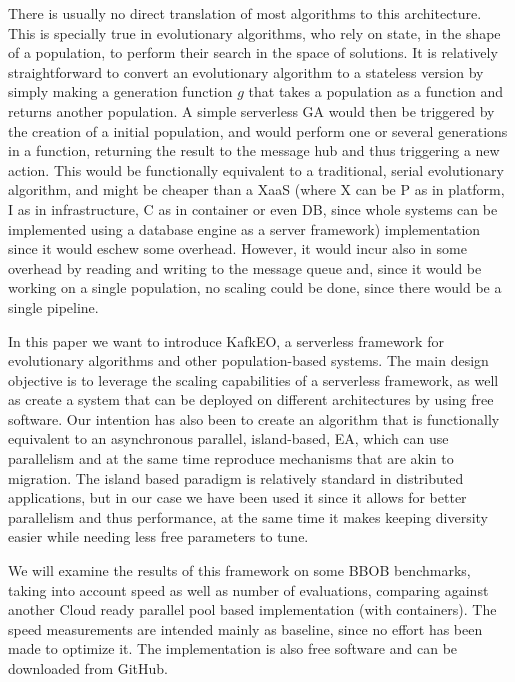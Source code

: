 \documentclass[sigconf]{acmart}
\begin{document}
There is usually no direct translation of most algorithms to this
architecture. This is specially true in evolutionary algorithms, who
rely on state, in the shape of a population, to perform their search
in the space of solutions. It is relatively straightforward to convert
an evolutionary algorithm to a stateless version by simply making a
{\sf generation} function $g$ that takes a population as a function
and returns another population. A simple serverless GA would then be
triggered by the creation of a initial population, and would perform
one or several generations in a function, returning the result to the
message hub and thus triggering a new action. This would be
functionally equivalent to a traditional, serial evolutionary
algorithm, and might be cheaper than a XaaS (where X can be P as in
platform, I as in infrastructure, C as in container or even DB, since
whole systems can be implemented using a database engine as a server framework) implementation since it
would eschew some overhead. However, it would incur also in some
overhead by reading and writing to the message queue and, since it
would be working on a single population, no scaling could be done,
since there would be a single pipeline.

In this paper we want to introduce KafkEO, a serverless framework for
evolutionary algorithms and other population-based systems. The main
design objective is to leverage the scaling capabilities of a
serverless framework, as well as create a system that can be deployed
on different architectures by using free software. Our intention has
also been to create an algorithm that is functionally equivalent to an asynchronous
parallel, island-based, EA, which can use parallelism and at the same
time reproduce mechanisms that are akin to migration. The island based
paradigm is relatively standard in distributed applications, but in
our case we have been used it since it allows for better parallelism
and thus performance, at the same time it makes keeping diversity
easier while needing less free parameters to tune. 

We will examine the results of this framework on some BBOB benchmarks,
taking into account speed as well as number of evaluations, comparing
against another Cloud ready parallel pool based implementation (with
containers). The speed measurements are intended mainly as baseline,
since no effort has been made to optimize it.
The
implementation is also free software and can be downloaded from
GitHub.
\end{document}
